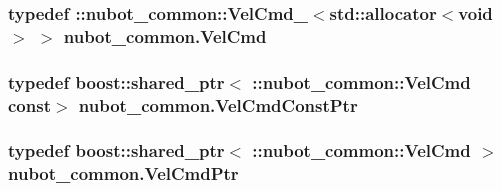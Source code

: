 \hypertarget{namespacenubot__common_a7dcbb6e0f9d7827fd3a4c5b347ae3cfa}{
\subsubsection[{Vel\-Cmd}]{\setlength{\rightskip}{0pt plus 5cm}typedef \-::{\bf nubot\-\_\-common\-::\-Vel\-Cmd\-\_\-}$<$std\-::allocator$<$void$>$ $>$ {\bf nubot\-\_\-common.\-Vel\-Cmd}}}\label{namespacenubot__common_a7dcbb6e0f9d7827fd3a4c5b347ae3cfa}
\hypertarget{namespacenubot__common_a8cb6ca1f6040766fed7e93b076a46233}{
\subsubsection[{Vel\-Cmd\-Const\-Ptr}]{\setlength{\rightskip}{0pt plus 5cm}typedef boost\-::shared\-\_\-ptr$<$ \-::{\bf nubot\-\_\-common\-::\-Vel\-Cmd} const$>$ {\bf nubot\-\_\-common.\-Vel\-Cmd\-Const\-Ptr}}}\label{namespacenubot__common_a8cb6ca1f6040766fed7e93b076a46233}
\hypertarget{namespacenubot__common_ab8f33f5e88e6ab7d9002f4eeb9d638db}{
\subsubsection[{Vel\-Cmd\-Ptr}]{\setlength{\rightskip}{0pt plus 5cm}typedef boost\-::shared\-\_\-ptr$<$ \-::{\bf nubot\-\_\-common\-::\-Vel\-Cmd} $>$ {\bf nubot\-\_\-common.\-Vel\-Cmd\-Ptr}}}\label{namespacenubot__common_ab8f33f5e88e6ab7d9002f4eeb9d638db}


